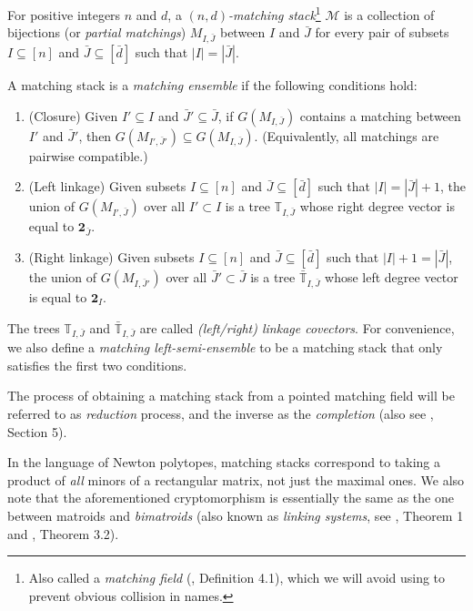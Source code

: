 \documentclass[letterpaper,reqno,11pt]{amsart}
\begin{document}
\begin{definition}
    For positive integers $n$ and $d$, a \emph{$(n,d)$-matching stack}\footnote{Also called a \emph{matching field} (\cite{Ensembles}, Definition 4.1), which we will avoid using to prevent obvious collision in names.} $\mathcal{M}$ is a collection of bijections (or \emph{partial matchings}) $M_{I, \bar{J}}$ between $I$ and $\bar{J}$ for every pair of subsets $I\subseteq [n]$ and $\bar{J}\subseteq [\bar{d}]$ such that $|I| = |\bar{J}|$. 

    A matching stack is a \emph{matching ensemble} if the following conditions hold: \begin{enumerate}
        \item (Closure) Given $I'\subseteq I$ and $\bar{J}'\subseteq \bar{J}$, if $G(M_{I, \bar{J}})$ contains a matching between $I'$ and $\bar{J}'$, then $G(M_{I', \bar{J}'}) \subseteq G(M_{I, \bar{J}})$. (Equivalently, all matchings are pairwise compatible.)
        \item (Left linkage) Given subsets $I\subseteq [n]$ and $\bar{J}\subseteq [\bar{d}]$ such that $|I| = |\bar{J}| + 1$, the union of $G(M_{I', \bar{J}})$ over all $I'\subset I$ is a tree $\mathbb{T}_{I, \bar{J}}$ whose right degree vector is equal to $\mathbf{2}_{\bar{J}}$.
        \item (Right linkage) Given subsets $I\subseteq [n]$ and $\bar{J}\subseteq [\bar{d}]$ such that $|I| + 1 = |\bar{J}|$, the union of $G(M_{I, \bar{J}'})$ over all $\bar{J}'\subset \bar{J}$ is a tree $\bar{\mathbb{T}}_{I, \bar{J}}$ whose left degree vector is equal to $\mathbf{2}_{I}$.
    \end{enumerate}

    The trees $\mathbb{T}_{I, \bar{J}}$ and $\bar{\mathbb{T}}_{I, \bar{J}}$ are called \emph{(left/right) linkage covectors}. For convenience, we also define a \emph{matching left-semi-ensemble} to be a matching stack that only satisfies the first two conditions.
\end{definition}

The process of obtaining a matching stack from a pointed matching field will be referred to as \emph{reduction} process, and the inverse as the \emph{completion} (also see \cite{FieldLattice}, Section 5).

In the language of Newton polytopes, matching stacks correspond to taking a product of \emph{all} minors of a rectangular matrix, not just the maximal ones. We also note that the aforementioned cryptomorphism is essentially the same as the one between matroids and \emph{bimatroids} (also known as \emph{linking systems}, see \cite{Bimatroids}, Theorem 1 and \cite{LinkingSys}, Theorem 3.2).
\end{document}
